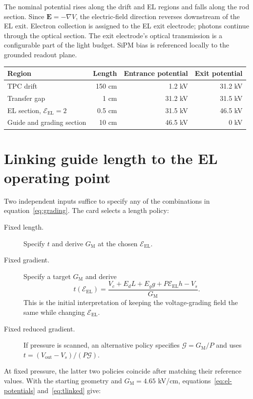 \documentclass[11pt,a4paper]{article}
\newcommand{\EP}{\mathcal{E}_{\mathrm{EL}}}
\newcommand{\gradV}{G_{\mathrm{M}}}
\begin{document}
The nominal potential rises along the drift and EL regions and falls along
the rod section. Since $\mathbf E=-\nabla V$, the electric-field direction
reverses downstream of the EL exit. Electron collection is assigned to the
EL exit electrode; photons continue through the optical section. The exit
electrode's optical transmission is a configurable part of the light budget.
SiPM bias is referenced locally to the grounded readout plane.

\begin{center}
\begin{tabular}{lrrr}
\toprule
Region & Length & Entrance potential & Exit potential\\
\midrule
TPC drift & 150 cm & 1.2 kV & 31.2 kV\\
Transfer gap & 1 cm & 31.2 kV & 31.5 kV\\
EL section, $\EP=2$ & 0.5 cm & 31.5 kV & 46.5 kV\\
Guide and grading section & 10 cm & 46.5 kV & 0 kV\\
\bottomrule
\end{tabular}
\end{center}

\section{Linking guide length to the EL operating point}
Two independent inputs suffice to specify any of the combinations in
equation~\eqref{eq:grading}. The card selects a length policy:
\begin{description}
 \item[Fixed length.] Specify $t$ and derive $\gradV$ at the chosen $\EP$.
 \item[Fixed gradient.] Specify a target $\gradV$ and derive
 \begin{equation}
 t(\EP)=\frac{V_c+E_dL+E_g g+P\EP h-V_s}{\gradV}.
 \label{eq:tlinked}
 \end{equation}
 This is the initial interpretation of keeping the voltage-grading field the
 same while changing $\EP$.
 \item[Fixed reduced gradient.] If pressure is scanned, an alternative policy
 specifies $\mathcal G=\gradV/P$ and uses
 $t=(V_{\mathrm{out}}-V_s)/(P\mathcal G)$.
\end{description}
At fixed pressure, the latter two policies coincide after matching their
reference values. With the starting geometry and $\gradV=4.65$ kV/cm,
equations~\eqref{eq:el-potentials} and~\eqref{eq:tlinked} give:
\end{document}
